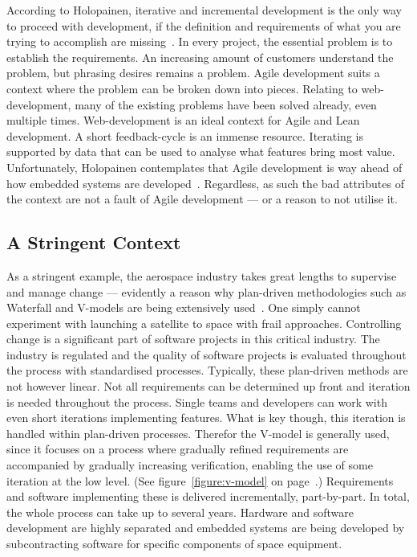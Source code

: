 \documentclass[english]{tktltiki2}
\begin{document}
According to Holopainen, iterative and incremental development is the only way to proceed with development, if the definition and requirements of what you are trying to accomplish are missing~\cite{Hol15a}. In every project, the essential problem is to establish the requirements. An increasing amount of customers understand the problem, but phrasing desires remains a problem. Agile development suits a context where the problem can be broken down into pieces. Relating to web-development, many of the existing problems have been solved already, even multiple times. Web-development is an ideal context for Agile and Lean development. A short feedback-cycle is an immense resource. Iterating is supported by data that can be used to analyse what features bring most value. Unfortunately, Holopainen contemplates that Agile development is way ahead of how embedded systems are developed~\cite{Hol15a}. Regardless, as such the bad attributes of the context are not a fault of Agile development — or a reason to not utilise it.

\subsection{A Stringent Context}

As a stringent example, the aerospace industry takes great lengths to supervise and manage change — evidently a reason why plan-driven methodologies such as Waterfall and V-models are being extensively used~\cite{Hol15b}. One simply cannot experiment with launching a satellite to space with frail approaches. Controlling change is a significant part of software projects in this critical industry. The industry is regulated and the quality of software projects is evaluated throughout the process with standardised processes. Typically, these plan-driven methods are not however linear. Not all requirements can be determined up front and iteration is needed throughout the process. Single teams and developers can work with even short iterations implementing features. What is key though, this iteration is handled within plan-driven processes. Therefor the V-model is generally used, since it focuses on a process where gradually refined requirements are accompanied by gradually increasing verification, enabling the use of some iteration at the low level. (See figure~\ref{figure:v-model} on page~\pageref{figure:v-model}.) Requirements and software implementing these is delivered incrementally, part-by-part. In total, the whole process can take up to several years. Hardware and software development are highly separated and embedded systems are being developed by subcontracting software for specific components of space equipment.
\end{document}
